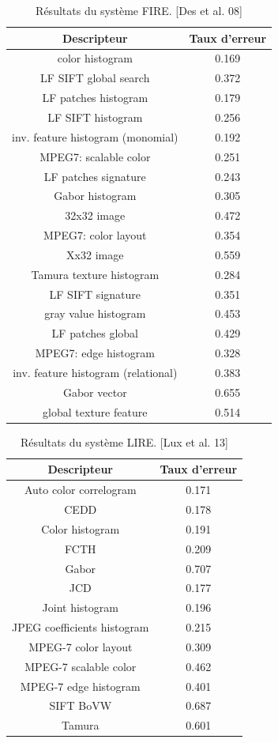 	
\begin{table}[H]
\begin{center}
\begin{tabular}{|c|c|}
\hline
Descripteur & Taux d'erreur\\
\hline
color histogram & 0.169\\
LF SIFT global search & 0.372\\
LF patches histogram & 0.179\\
LF SIFT histogram & 0.256\\
inv. feature histogram (monomial) & 0.192\\
MPEG7: scalable color & 0.251\\
LF patches signature & 0.243\\
Gabor histogram & 0.305\\
32x32 image & 0.472\\
MPEG7: color layout & 0.354\\
Xx32 image & 0.559\\
Tamura texture histogram & 0.284\\
LF SIFT signature & 0.351\\
gray value histogram & 0.453\\
LF patches global & 0.429\\
MPEG7: edge histogram & 0.328\\
inv. feature histogram (relational) & 0.383\\
Gabor vector & 0.655\\
global texture feature & 0.514\\
\hline
\end{tabular}
\end{center}
\caption{Résultats du système FIRE. [Des et al. 08]}
\end{table}


\begin{table}[H]
\begin{center}
\begin{tabular}{|c|c|}
\hline
Descripteur & Taux d'erreur\\
\hline
Auto color correlogram & 0.171\\
CEDD & 0.178\\
Color histogram & 0.191\\
FCTH & 0.209\\
Gabor & 0.707\\
JCD & 0.177\\
Joint histogram & 0.196\\
JPEG coefficients histogram & 0.215\\
MPEG-7 color layout & 0.309\\
MPEG-7 scalable color & 0.462\\
MPEG-7 edge histogram & 0.401\\
SIFT BoVW & 0.687\\
Tamura & 0.601\\
\hline
\end{tabular}
\end{center}
\caption{Résultats du système LIRE. [Lux et al. 13]}
\end{table}

